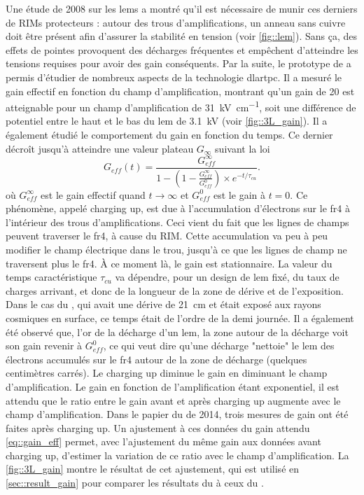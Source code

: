       Une étude de 2008 sur les \glspl{lem}\cite{Breskin2008} a montré qu'il est nécessaire de munir ces derniers de RIMs protecteurs : autour des trous d'amplifications, un anneau sans cuivre doit être présent afin d'assurer la stabilité en tension (voir \autoref{fig::lem}). Sans ça, des effets de pointes provoquent des décharges fréquentes et empêchent d'atteindre les tensions requises pour avoir des gain conséquents. Par la suite, le prototype de \threeL{}\cite{Cantini2013,Cantini2014} a permis d'étudier de nombreux aspects de la technologie \gls{dlartpc}. Il a mesuré le gain effectif en fonction du champ d'amplification, montrant qu'un gain de 20 est atteignable pour un champ d'amplification de \SI{31}{\kilo\volt\per\centi\meter}, soit une différence de potentiel entre le haut et le bas du \gls{lem} de \SI{3.1}{\kilo\volt} (voir \autoref{fig::3L_gain}). Il a également étudié le comportement du gain en fonction du temps. Ce dernier décroît jusqu'à atteindre une valeur plateau $G_{\infty}$ suivant la loi
      \begin{equation}
        G_{eff}(t) = \frac{G_{eff}^{\infty}}{1-\left(1-\frac{G_{eff}^{\infty}}{G_{eff}^0}\right)\times e^{-t/\tau_{cu}}}.
      \end{equation}
      où $G_{eff}^{\infty}$ est le gain effectif quand $t\to\infty$ et $G_{eff}^0$ est le gain à $t=0$. Ce phénomène, appelé charging up, est due à l'accumulation d'électrons sur le \gls{fr4} à l'intérieur des trous d'amplifications. Ceci vient du fait que les lignes de champs peuvent traverser le \gls{fr4}, à cause du RIM. Cette accumulation va peu à peu modifier le champ électrique dans le trou, jusqu'à ce que les lignes de champ ne traversent plus le \gls{fr4}. À ce moment là, le gain est stationnaire. La valeur du temps caractéristique $\tau_{cu}$ va dépendre, pour un design de \gls{lem} fixé, du taux de charges arrivant, et donc de la longueur de la zone de dérive et de l'exposition. Dans le cas du \threeL{}, qui avait une dérive de \SI{21}{\centi\meter} et était exposé aux rayons cosmiques en surface, ce temps était de l'ordre de la demi journée. Il a également été observé que, l'or de la décharge d'un \gls{lem}, la zone autour de la décharge voit son gain revenir à $G_{eff}^0$, ce qui veut dire qu'une décharge "nettoie" le \gls{lem} des électrons accumulés sur le \gls{fr4} autour de la zone de décharge (quelques centimètres carrés).  Le charging up diminue le gain en diminuant le champ d'amplification. Le gain en fonction de l'amplification étant exponentiel, il est attendu que le ratio entre le gain avant et après charging up augmente avec le champ d'amplification. Dans le papier du \threeL{} de 2014, trois mesures de gain ont été faites après charging up. Un ajustement à ces données du gain attendu \eqref{eq::gain_eff} permet, avec l'ajustement du même gain aux données avant charging up, d'estimer la variation de ce ratio avec le champ d'amplification. La \autoref{fig::3L_gain} montre le résultat de cet ajustement, qui est utilisé en \autoref{sec::result_gain} pour comparer les résultats du \TOO{} à ceux du \threeL{}.

